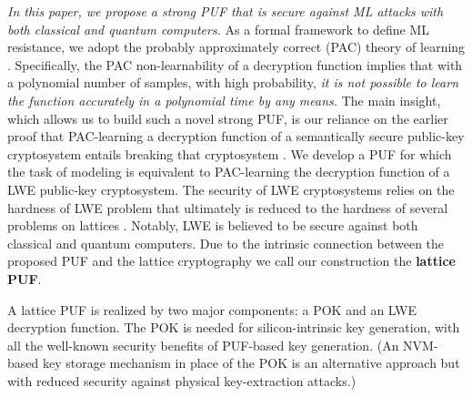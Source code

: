 \emph{In this paper, we propose a strong PUF that is secure against ML attacks with both classical and quantum computers.} \cite{wang2020lattice} 
As a formal framework to define ML resistance, we adopt the probably approximately correct (PAC) theory of learning \cite{mohri2012foundations}. 
Specifically, the PAC non-learnability of a decryption function implies that with a polynomial number of samples, with high probability, \emph{it is not possible to learn the function accurately in a polynomial time by any means.}
The main insight, which allows us to build such a novel strong PUF, is our reliance on the earlier proof that PAC-learning a decryption function of a semantically secure public-key cryptosystem entails breaking that cryptosystem %
\cite{kearns1994cryptographic, klivans2006cryptographic}.
We develop a PUF for which the task of modeling is equivalent to PAC-learning the decryption function of a LWE public-key cryptosystem.
The security of LWE cryptosystems relies on the hardness of LWE problem that ultimately is reduced to the hardness of several problems on lattices \cite{regev2009lattices}. 
Notably, LWE is believed to be secure against both classical and quantum computers.
Due to the intrinsic connection between the proposed PUF and the lattice cryptography we call our construction the \textbf{lattice PUF}.


A lattice PUF is realized by two major components: a POK and an LWE decryption function. The POK is needed for silicon-intrinsic key generation, with all the well-known security benefits of PUF-based key generation. (An NVM-based key storage mechanism in place of the POK is an alternative approach but with reduced security against physical key-extraction attacks.)

